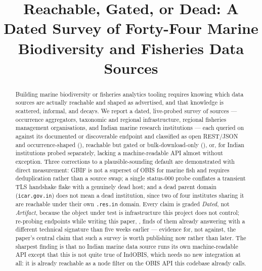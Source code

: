 \documentclass[conference]{IEEEtran}
\begin{document}
\title{Reachable, Gated, or Dead: A Dated Survey of Forty-Four Marine
Biodiversity and Fisheries Data Sources}

\author{
}

\maketitle

\begin{abstract}
Building marine biodiversity or fisheries analytics tooling requires knowing
which data sources are actually reachable and shaped as advertised, and that
knowledge is scattered, informal, and decays. We report a dated, live-probed
survey of \NSourcesSurveyed{} sources --- occurrence aggregators, taxonomic
and regional infrastructure, regional fisheries management organisations,
and Indian marine research institutions --- each queried on \ProbeDate{}
against its documented or discoverable endpoint and classified as open
REST/JSON and occurrence-shaped (\NTierOne{}), reachable but gated or
bulk-download-only (\NTierTwo{}), or, for \NTierThree{} Indian institutions
probed separately, lacking a machine-readable API almost without exception.
Three corrections to a plausible-sounding default are demonstrated with
direct measurement: GBIF is not a superset of OBIS for marine fish and
requires deduplication rather than a source swap; a single status-000 probe
conflates a transient TLS handshake flake with a genuinely dead host; and a
dead parent domain (\texttt{icar.gov.in}) does not mean a dead institution,
since two of four institutes sharing it are reachable under their own
\texttt{.res.in} domain. Every claim is graded \emph{Dated}, not
\emph{Artifact}, because the object under test is infrastructure this
project does not control; re-probing \NEndpointsReprobed{} endpoints while
writing this paper, \AsOf{}, finds \NEndpointsDrifted{} of them already
answering with a different technical signature than five weeks earlier ---
evidence for, not against, the paper's central claim that such a survey is
worth publishing now rather than later. The sharpest finding is that no
Indian marine data source runs its own machine-readable API except that this
is not quite true of IndOBIS, which needs no new integration at all: it is
already reachable as a node filter on the OBIS API this codebase already
calls.
\end{abstract}
\end{document}
